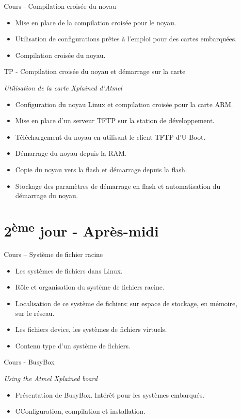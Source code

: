 \documentclass[a4paper,12pt,obeyspaces,spaces,hyphens]{article}
\begin{document}
\feagendatwocolumn
{Cours - Compilation croisée du noyau}
{
  \begin{itemize}
  \item Mise en place de la compilation croisée pour le noyau.
  \item Utilisation de configurations prêtes à l'emploi pour des cartes embarquées.
  \item Compilation croisée du noyau.
  \end{itemize}
}
{TP - Compilation croisée du noyau et démarrage sur la carte}
{
  {\em Utilisation de la carte Xplained d'Atmel}
  \begin{itemize}
  \item Configuration du noyau Linux et compilation croisée pour la carte ARM.
  \item Mise en place d'un serveur TFTP sur la station de développement.
  \item Téléchargement du noyau en utilisant le client TFTP d'U-Boot.
  \item Démarrage du noyau depuis la RAM.
  \item Copie du noyau vers la flash et démarrage depuis la flash.
  \item Stockage des paramètres de démarrage en flash et automatisation
	du démarrage du noyau.
  \end{itemize}
}

\section{2\textsuperscript{ème} jour - Après-midi}

\feagendatwocolumn
{Cours – Système de fichier racine}
{
  \begin{itemize}
  \item Les systèmes de fichiers dans Linux.
  \item Rôle et organisation du système de fichiers racine.
  \item Localisation de ce système de fichiers: sur espace
	de stockage, en mémoire, sur le réseau.
  \item Les fichiers device, les systèmes de fichiers virtuels.
  \item Contenu type d'un système de fichiers.
  \end{itemize}
}
{Cours - BusyBox}
{
  {\em Using the Atmel Xplained board}
  \begin{itemize}
  \item Présentation de BusyBox. Intérêt pour les systèmes embarqués.
  \item CConfiguration, compilation et installation.
  \end{itemize}
}
\end{document}
